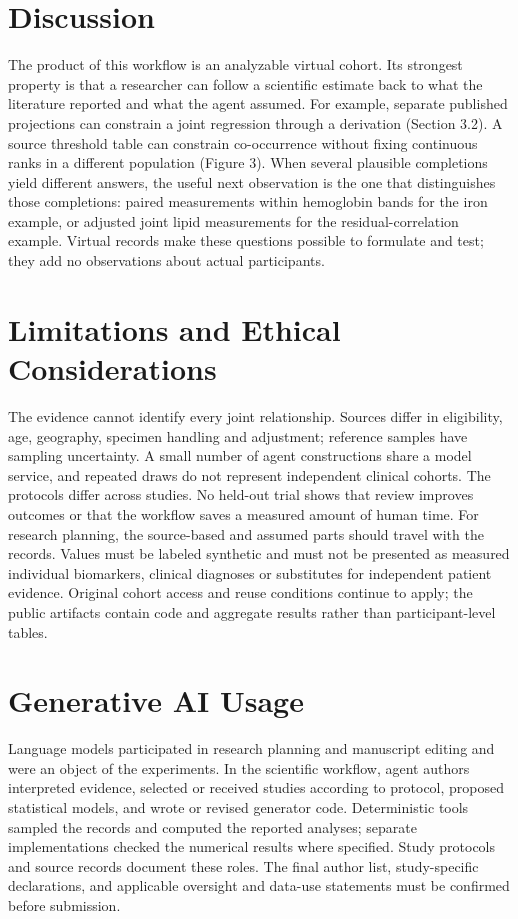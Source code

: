 \documentclass[sigconf,review]{acmart}
\begin{document}
\section{Discussion}

The product of this workflow is an analyzable virtual cohort. Its strongest property is that a researcher can follow a scientific estimate back to what the literature reported and what the agent assumed. For example, separate published projections can constrain a joint regression through a derivation (Section 3.2). A source threshold table can constrain co-occurrence without fixing continuous ranks in a different population (Figure 3). When several plausible completions yield different answers, the useful next observation is the one that distinguishes those completions: paired measurements within hemoglobin bands for the iron example, or adjusted joint lipid measurements for the residual-correlation example. Virtual records make these questions possible to formulate and test; they add no observations about actual participants.


\section{Limitations and Ethical Considerations}

The evidence cannot identify every joint relationship. Sources differ in eligibility, age, geography, specimen handling and adjustment; reference samples have sampling uncertainty. A small number of agent constructions share a model service, and repeated draws do not represent independent clinical cohorts. The protocols differ across studies. No held-out trial shows that review improves outcomes or that the workflow saves a measured amount of human time. For research planning, the source-based and assumed parts should travel with the records. Values must be labeled synthetic and must not be presented as measured individual biomarkers, clinical diagnoses or substitutes for independent patient evidence. Original cohort access and reuse conditions continue to apply; the public artifacts contain code and aggregate results rather than participant-level tables.


\section{Generative AI Usage}

Language models participated in research planning and manuscript editing and were an object of the experiments. In the scientific workflow, agent authors interpreted evidence, selected or received studies according to protocol, proposed statistical models, and wrote or revised generator code. Deterministic tools sampled the records and computed the reported analyses; separate implementations checked the numerical results where specified. Study protocols and source records document these roles. The final author list, study-specific declarations, and applicable oversight and data-use statements must be confirmed before submission.
\end{document}
